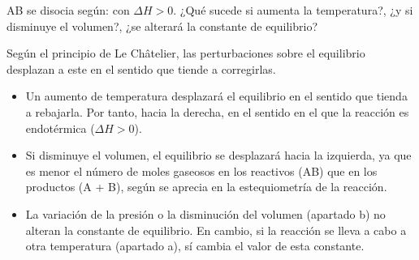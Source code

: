 \begin{exercise} %
    AB se disocia según:  con \(\Delta H > 0\).
    ¿Qué sucede si aumenta la temperatura?, ¿y si disminuye el volumen?, ¿se alterará la constante de equilibrio?
    \begin{solu}
        Según el principio de Le Châtelier, las perturbaciones sobre el equilibrio desplazan a este en el
        sentido que tiende a corregirlas.
        \begin{itemize}
            \item Un aumento de temperatura desplazará el equilibrio en el sentido que tienda a rebajarla. Por tanto, hacia la derecha, en el sentido en el que la reacción es endotérmica (\( \Delta H > 0 \)).
            \item Si disminuye el volumen, el equilibrio se desplazará hacia la izquierda, ya que es menor el número
            de moles gaseosos en los reactivos (AB) que en los productos (A + B), según se aprecia en la estequiometría
            de la reacción.
            \item La variación de la presión o la disminución del volumen (apartado b) no alteran la constante de
            equilibrio. En cambio, si la reacción se lleva a cabo a otra temperatura (apartado a), sí cambia
            el valor de esta constante.
        \end{itemize}
    \end{solu}
\end{exercise}

